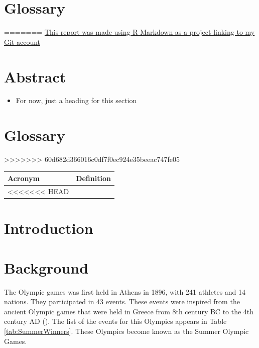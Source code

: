\documentclass[
]{article}
\providecommand{\tightlist}{%
  \setlength{\itemsep}{0pt}\setlength{\parskip}{0pt}}
\begin{document}
\newpage
\tableofcontents

\section*{Glossary}\label{glossary}
=======
{
\setcounter{tocdepth}{2}
\tableofcontents
}
\href{https://github.com/stvdb914/DSAA811-Preliminary-Report}{This report was made using R Markdown as a project linking to my Git account}

\newpage

\section{Abstract}\label{abstract}

\begin{itemize}
\tightlist
\item
  For now, just a heading for this section
\end{itemize}

\section{Glossary}\label{glossary}
>>>>>>> 60d682d366016c0df7f0ec924e35beeac747fe05

\begin{longtable}[l]{>{}ll}
\toprule
Acronym & Definition\\
\midrule
<<<<<<< HEAD
\textbf{\cellcolor{gray!10}{NOC}} & \cellcolor{gray!10}{National Olympic Committee}\\
\bottomrule
\end{longtable}

\newpage

\section*{Introduction}\label{introduction}

\newpage

\section*{Background}\label{background}

The Olympic games was first held in Athens in 1896, with 241 athletes and 14 nations. They participated in 43 events. These events were inspired from the ancient Olympic games that were held in Greece from 8th century BC to the 4th century AD (). The list of the events for this Olympics appears in Table \ref{tab:SummerWinners}. These Olympics become known as the Summer Olympic Games.
\end{document}
